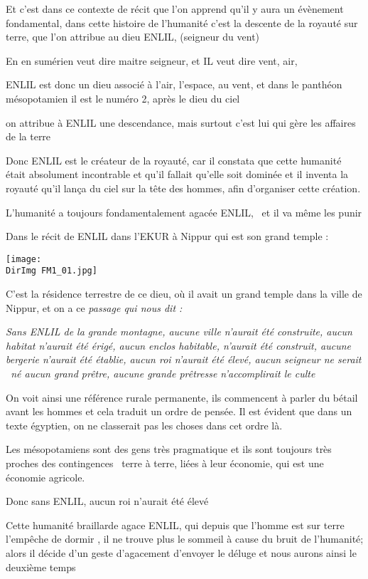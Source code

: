 \documentclass[a4paper]{article}
\newcommand{\DirImg}{../img/FaivreMartin/}
\begin{document}
Et c'est dans ce contexte de récit que l'on apprend qu'il y aura un évènement fondamental, dans cette histoire de
l'humanité c'est la descente de la royauté sur terre, que l'on attribue au dieu ENLIL, (seigneur du vent)

En en sumérien veut dire maitre seigneur, et IL veut dire vent, air, 

ENLIL est donc un dieu associé à l'air, l'espace, au vent, et dans le panthéon mésopotamien il est le numéro 2, après le
dieu du ciel

on attribue à ENLIL une descendance, mais surtout c'est lui qui gère les affaires de la terre


Donc ENLIL est le créateur de la royauté, car il constata que cette humanité était absolument incontrable et qu'il
fallait qu'elle soit dominée et il inventa la royauté qu'il lança du ciel sur la tête des hommes, afin d'organiser
cette création.

L'humanité a toujours fondamentalement agacée ENLIL, \ et il va même les punir


Dans le récit de ENLIL dans l'EKUR à Nippur qui est son grand temple :


\texttt{[image: \\DirImg FM1\_01.jpg]} 


C'est la résidence terrestre de ce dieu, où il avait un grand temple dans la ville de Nippur, et on a ce \textit{passage
qui nous dit :}


\textit{\og Sans ENLIL de la grande montagne, aucune ville n'aurait été construite, aucun habitat n'aurait
été érigé, aucun enclos habitable, n'aurait été construit, aucune bergerie n'aurait été établie, aucun roi n'aurait été
élevé, aucun seigneur ne serait \ né aucun grand prêtre, aucune grande prêtresse n'accomplirait le culte \fg }


On voit ainsi une référence rurale permanente, ils commencent à parler du bétail avant les hommes et cela traduit un
ordre de pensée. Il est évident que dans un texte égyptien, on ne classerait pas les choses dans cet ordre là.

Les mésopotamiens sont des gens très pragmatique et ils sont toujours très proches des contingences \ terre à terre,
liées à leur économie, qui est une économie agricole.


Donc sans ENLIL, aucun roi n'aurait été élevé

Cette humanité braillarde agace ENLIL, qui depuis que l'homme est sur terre l'empêche de dormir , il ne trouve plus le
sommeil à cause du bruit de l'humanité; alors il décide d'un geste d'agacement d'envoyer le déluge et nous aurons ainsi
le deuxième temps
\end{document}
